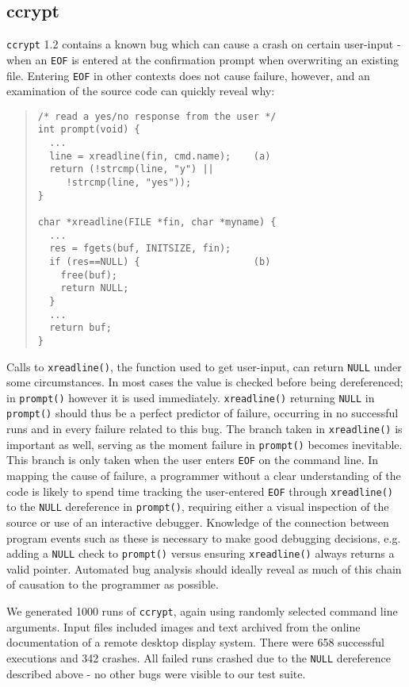 \subsection{ccrypt}
\texttt{ccrypt} 1.2 contains a known bug which can cause a crash on certain user-input - when an \texttt{EOF} is entered at the confirmation prompt when overwriting an existing file.  Entering \texttt{EOF} in other contexts does not cause failure, however, and an examination of the source code can quickly reveal why:
\begin{quote}
\begin{verbatim}
/* read a yes/no response from the user */
int prompt(void) {
  ...
  line = xreadline(fin, cmd.name);    (a)
  return (!strcmp(line, "y") ||
     !strcmp(line, "yes"));
}

char *xreadline(FILE *fin, char *myname) {
  ...
  res = fgets(buf, INITSIZE, fin);
  if (res==NULL) {                    (b)
    free(buf);
    return NULL;
  }
  ...
  return buf;
}

\end{verbatim}
\end{quote}
Calls to \texttt{xreadline()}, the function used to get user-input, can return \texttt{NULL} under some circumstances.  In most cases the value is checked before being dereferenced; in \texttt{prompt()} however it is used immediately.  \texttt{xreadline()} returning \texttt{NULL} in \texttt{prompt()} should thus be a perfect predictor of failure, occurring in no successful runs and in every failure related to this bug.  The branch taken in \texttt{xreadline()} is important as well, serving as the moment failure in \texttt{prompt()} becomes inevitable.  This branch is only taken when the user enters \texttt{EOF} on the command line.  In mapping the cause of failure, a programmer without a clear understanding of the code is likely to spend time tracking the user-entered \texttt{EOF} through \texttt{xreadline()} to the \texttt{NULL} dereference in \texttt{prompt()}, requiring either a visual inspection of the source or use of an interactive debugger.  Knowledge of the connection between program events such as these is necessary to make good debugging decisions, e.g. adding a \texttt{NULL} check to \texttt{prompt()} versus ensuring \texttt{xreadline()} always returns a valid pointer.  Automated bug analysis should ideally reveal as much of this chain of causation to the programmer as possible.

We generated 1000 runs of \texttt{ccrypt}, again using randomly selected command line arguments.  Input files included images and text archived from the online documentation of a remote desktop display system.  There were 658 successful executions and 342 crashes.  All failed runs crashed due to the \texttt{NULL} dereference described above - no other bugs were visible to our test suite.

